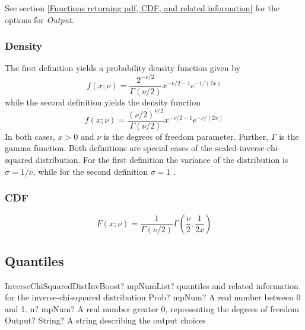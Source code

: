 \vspace{0.3cm}
See section \ref{Functions returning pdf, CDF, and related information} for the options for {\itshape\sffamily Output}. 


\subsubsection{Density}
\label{InverseChiSquaredDistributionDensity}

The first definition yields a probability density function given by
\begin{equation} 
	f(x;\nu)= \frac{2^{-\nu/2}}{\Gamma(\nu /2)} x^{-\nu/2-1} e^{-1/(2x)}
\end{equation}
while the second definition yields the density function
\begin{equation} 
	f(x;\nu)= \frac{(\nu/2)^{\nu/2}}{\Gamma(\nu /2)} x^{-\nu/2-1} e^{-\nu/(2x)}
\end{equation}
In both cases, $x>0$  and  $\nu$  is the degrees of freedom parameter. Further, $\Gamma$ is the gamma function. Both definitions are special cases of the scaled-inverse-chi-squared distribution. For the first definition the variance of the distribution is $\sigma=1/\nu$, while for the second definition $\sigma=1$ .



\subsubsection{CDF}
\begin{equation} 
	F(x;\nu)= \frac{1}{\Gamma(\nu /2)} \Gamma\left(\frac{\nu}{2},\frac{1}{2x}\right) 
\end{equation}



\subsection{Quantiles}


\begin{mpFunctionsExtract}
	\mpFunctionThree
	{InverseChiSquaredDistInvBoost? mpNumList? quantiles and related information for the inverse-chi-squared distribution}
	{Prob? mpNum? A real number between 0 and 1.}
	{n? mpNum? A real number greater 0, representing the degrees of freedom}
	{Output? String? A string describing the output choices}
\end{mpFunctionsExtract}

